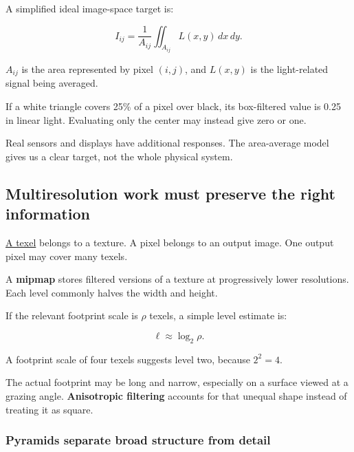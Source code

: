 \hypertarget{04-visual-computing-ii-ch043-a-pixel-value-can-be-an-average-over-an-area}{}

A simplified ideal image-space target is:

\[
I_{ij}=\frac1{A_{ij}}\iint_{A_{ij}}L(x,y)\,dx\,dy.
\]

\(A_{ij}\) is the area represented by pixel \((i,j)\), and \(L(x,y)\) is the light-related signal being averaged.

If a white triangle covers 25\% of a pixel over black, its box-filtered value is 0.25 in linear light. Evaluating only the center may instead give zero or one.

Real sensors and displays have additional responses. The area-average model gives us a clear target, not the whole physical system.

\subsection{Multiresolution work must preserve the right information}\label{04-visual-computing-ii-ch043-multiresolution-work-must-preserve-the-right-information}

\hypertarget{04-visual-computing-ii-ch043-multiresolution-work-must-preserve-the-right-information}{}

\hyperref[appendix-b677a85ba76f]{A texel} belongs to a texture. A pixel belongs to an output image. One output pixel may cover many texels.

A \textbf{mipmap} stores filtered versions of a texture at progressively lower resolutions. Each level commonly halves the width and height.

If the relevant footprint scale is \(\rho\) texels, a simple level estimate is:

\[
\ell\approx\log_2\rho.
\]

A footprint scale of four texels suggests level two, because \(2^2=4\).

The actual footprint may be long and narrow, especially on a surface viewed at a grazing angle. \textbf{Anisotropic filtering} accounts for that unequal shape instead of treating it as square.

\subsubsection{Pyramids separate broad structure from detail}\label{04-visual-computing-ii-ch043-pyramids-separate-broad-structure-from-detail}

\hypertarget{04-visual-computing-ii-ch043-pyramids-separate-broad-structure-from-detail}{}

